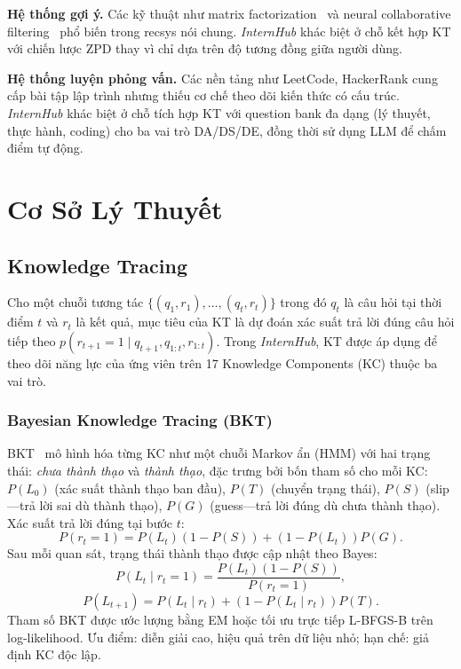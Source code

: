 \documentclass[conference]{IEEEtran}
\newcommand{\sys}{\textit{InternHub}}
\begin{document}
\textbf{Hệ thống gợi ý.} Các kỹ thuật như matrix factorization~\cite{koren2009matrix} và neural collaborative filtering~\cite{he2017neural} phổ biến trong recsys nói chung. \sys{} khác biệt ở chỗ kết hợp KT với chiến lược ZPD thay vì chỉ dựa trên độ tương đồng giữa người dùng.

\textbf{Hệ thống luyện phỏng vấn.} Các nền tảng như LeetCode, HackerRank cung cấp bài tập lập trình nhưng thiếu cơ chế theo dõi kiến thức có cấu trúc. \sys{} khác biệt ở chỗ tích hợp KT với question bank đa dạng (lý thuyết, thực hành, coding) cho ba vai trò DA/DS/DE, đồng thời sử dụng LLM để chấm điểm tự động.

\section{Cơ Sở Lý Thuyết}
\label{sec:theory}

\subsection{Knowledge Tracing}
Cho một chuỗi tương tác $\{(q_1,r_1),\ldots,(q_t,r_t)\}$ trong đó $q_t$ là câu hỏi tại thời điểm $t$ và $r_t$ là kết quả, mục tiêu của KT là dự đoán xác suất trả lời đúng câu hỏi tiếp theo $p(r_{t+1}=1\mid q_{t+1}, q_{1:t}, r_{1:t})$. Trong \sys{}, KT được áp dụng để theo dõi năng lực của ứng viên trên 17 Knowledge Components (KC) thuộc ba vai trò.

\subsubsection{Bayesian Knowledge Tracing (BKT)}
BKT~\cite{corbett1994knowledge} mô hình hóa từng KC như một chuỗi Markov ẩn (HMM) với hai trạng thái: \textit{chưa thành thạo} và \textit{thành thạo}, đặc trưng bởi bốn tham số cho mỗi KC: $P(L_0)$ (xác suất thành thạo ban đầu), $P(T)$ (chuyển trạng thái), $P(S)$ (slip---trả lời sai dù thành thạo), $P(G)$ (guess---trả lời đúng dù chưa thành thạo). Xác suất trả lời đúng tại bước $t$:
\begin{equation}
P(r_t=1)=P(L_t)(1-P(S))+(1-P(L_t))P(G).
\end{equation}
Sau mỗi quan sát, trạng thái thành thạo được cập nhật theo Bayes:
\begin{equation}
P(L_t\mid r_t=1)=\frac{P(L_t)(1-P(S))}{P(r_t=1)},
\end{equation}
\begin{equation}
P(L_{t+1})=P(L_t\mid r_t)+(1-P(L_t\mid r_t))P(T).
\end{equation}
Tham số BKT được ước lượng bằng EM hoặc tối ưu trực tiếp L-BFGS-B trên log-likelihood. Ưu điểm: diễn giải cao, hiệu quả trên dữ liệu nhỏ; hạn chế: giả định KC độc lập.
\end{document}
